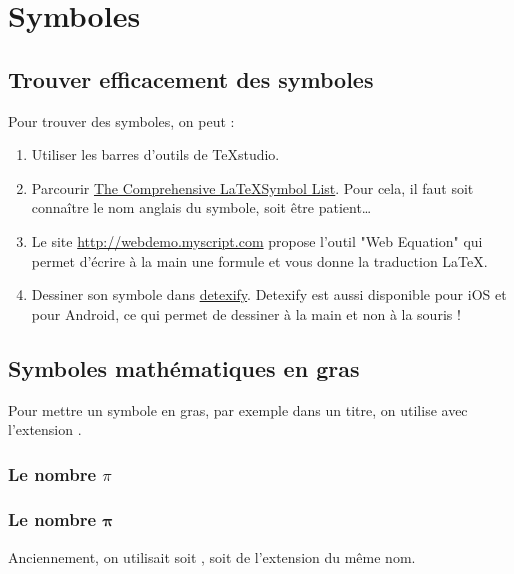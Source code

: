 \section{Symboles}



\subsection{Trouver efficacement des symboles}

Pour trouver des symboles, on peut :
\begin{enumerate}
	\item Utiliser les barres d'outils de TeXstudio.
	\item Parcourir \href{https://www.ctan.org/tex-archive/info/symbols/comprehensive/}{The Comprehensive \LaTeX Symbol List}. Pour cela, il faut soit connaître le nom anglais du symbole, soit être patient\dots
	\item Le site \href{http://webdemo.myscript.com}{\url{http://webdemo.myscript.com}} propose l'outil "Web Equation" qui permet d'écrire à la main une formule et vous donne la traduction \LaTeX.
	\item Dessiner son symbole dans \href{http://detexify.kirelabs.org/classify.html}{detexify}. Detexify est aussi disponible pour iOS et pour Android, ce qui permet de dessiner à la main et non à la souris !
\end{enumerate}



\subsection{Symboles mathématiques en gras}

Pour mettre un symbole en gras, par exemple dans un titre, on utilise \inlatex{\symbf} avec l'extension . 
\begin{LTXexample}[pos=o,width=.3]
\subsubsection*{Le nombre $\pi$}
\subsubsection*{Le nombre ${\symbf\pi}$}
\end{LTXexample}

Anciennement, on utilisait soit \inlatex{\mathbf{}}, soit \inlatex{\bm} de l'extension du même nom.


